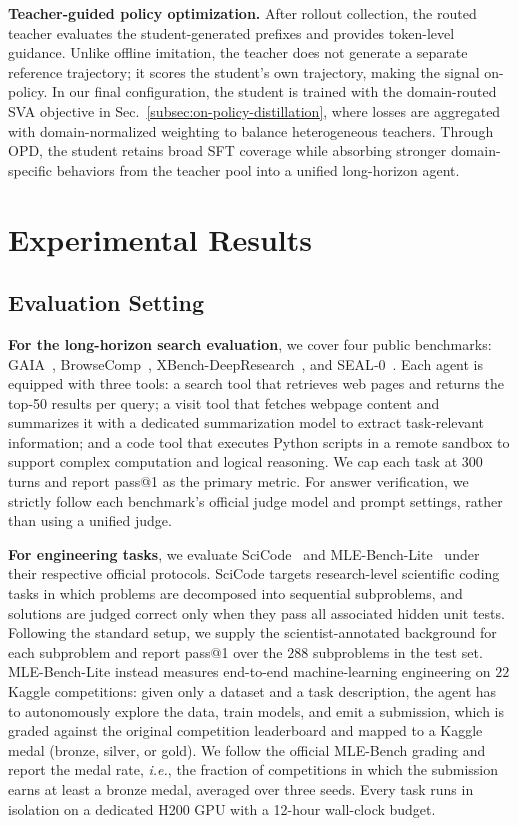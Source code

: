 \documentclass{llmxive}
\begin{document}
\textbf{Teacher-guided policy optimization.}
After rollout collection, the routed teacher evaluates the student-generated prefixes and provides token-level guidance. Unlike offline imitation, the teacher does not generate a separate reference trajectory; it scores the student's own trajectory, making the signal on-policy. In our final configuration, the student is trained with the domain-routed SVA objective in Sec.~\ref{subsec:on-policy-distillation}, where losses are aggregated with domain-normalized weighting to balance heterogeneous teachers. Through OPD, the student retains broad SFT coverage while absorbing stronger domain-specific behaviors from the teacher pool into a unified long-horizon agent.





\section{Experimental Results}
\label{sec:exp}

\subsection{Evaluation Setting} 
\textbf{For the long-horizon search evaluation}, we cover four public benchmarks: GAIA~\citep{gaia}, BrowseComp~\citep{browsecomp}, XBench-DeepResearch~\citep{xbench}, and SEAL‑0~\citep{sealqa}. Each agent is equipped with three tools: a search tool that retrieves web pages and returns the top‑50 results per query; a visit tool that fetches webpage content and summarizes it with a dedicated summarization model to extract task‑relevant information; and a code tool that executes Python scripts in a remote sandbox to support complex computation and logical reasoning. We cap each task at 300 turns and report pass@1 as the primary metric. For answer verification, we strictly follow each benchmark's official judge model and prompt settings, rather than using a unified judge.

\textbf{For engineering tasks}, we evaluate SciCode~\citep{scicode} and MLE-Bench-Lite~\citep{mlebench} under their respective official protocols. SciCode targets research-level scientific coding tasks in which problems are decomposed into sequential subproblems, and solutions are judged correct only when they pass all associated hidden unit tests. Following the standard setup, we supply the scientist-annotated background for each subproblem and report pass@1 over the $288$ subproblems in the test set. MLE-Bench-Lite instead measures end-to-end machine-learning engineering on $22$ Kaggle competitions: given only a dataset and a task description, the agent has to autonomously explore the data, train models, and emit a submission, which is graded against the original competition leaderboard and mapped to a Kaggle medal (bronze, silver, or gold). We follow the official MLE-Bench grading and report the medal rate, \textit{i.e.}, the fraction of competitions in which the submission earns at least a bronze medal, averaged over three seeds. Every task runs in isolation on a dedicated H200 GPU with a 12-hour wall-clock budget.
\end{document}

